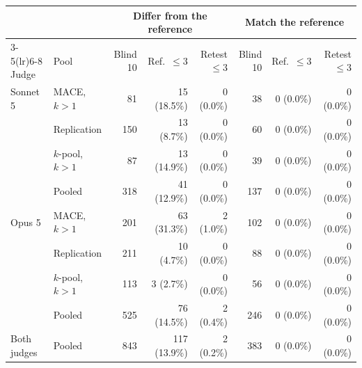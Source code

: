 \begin{tabular}{llrrrrrr}
\toprule
 & & \multicolumn{3}{c}{Differ from the reference} & \multicolumn{3}{c}{Match the reference} \\
\cmidrule(lr){3-5}\cmidrule(lr){6-8}
Judge & Pool & Blind 10 & Ref.\ $\leq 3$ & Retest $\leq 3$ & Blind 10 & Ref.\ $\leq 3$ & Retest $\leq 3$ \\
\midrule
Sonnet 5 & \textsc{MACE}, $k{>}1$ & 81 & 15 (18.5\%) & 0 (0.0\%) & 38 & 0 (0.0\%) & 0 (0.0\%) \\
 & Replication & 150 & 13 (8.7\%) & 0 (0.0\%) & 60 & 0 (0.0\%) & 0 (0.0\%) \\
 & $k$-pool, $k{>}1$ & 87 & 13 (14.9\%) & 0 (0.0\%) & 39 & 0 (0.0\%) & 0 (0.0\%) \\
 & Pooled & 318 & 41 (12.9\%) & 0 (0.0\%) & 137 & 0 (0.0\%) & 0 (0.0\%) \\
\addlinespace
Opus 5 & \textsc{MACE}, $k{>}1$ & 201 & 63 (31.3\%) & 2 (1.0\%) & 102 & 0 (0.0\%) & 0 (0.0\%) \\
 & Replication & 211 & 10 (4.7\%) & 0 (0.0\%) & 88 & 0 (0.0\%) & 0 (0.0\%) \\
 & $k$-pool, $k{>}1$ & 113 & 3 (2.7\%) & 0 (0.0\%) & 56 & 0 (0.0\%) & 0 (0.0\%) \\
 & Pooled & 525 & 76 (14.5\%) & 2 (0.4\%) & 246 & 0 (0.0\%) & 0 (0.0\%) \\
\addlinespace
Both judges & Pooled & 843 & 117 (13.9\%) & 2 (0.2\%) & 383 & 0 (0.0\%) & 0 (0.0\%) \\
\bottomrule
\end{tabular}
